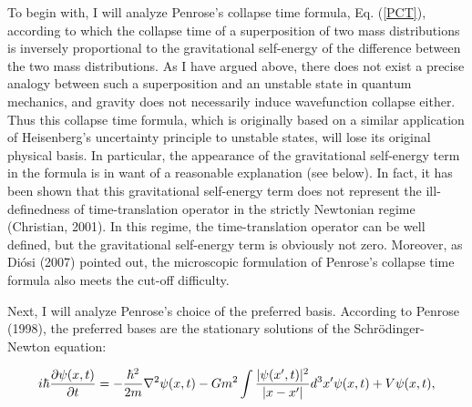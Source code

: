 To begin with, I will analyze Penrose's collapse time formula, Eq. (\ref{PCT}), according to which the collapse time of a superposition of two mass distributions is inversely proportional to the gravitational self-energy of the difference between the two mass distributions. As I have argued above, there does not exist a precise analogy between such a superposition and an unstable state in quantum mechanics, and gravity does not necessarily induce wavefunction collapse either. Thus this collapse time formula, which is originally based on a similar application of Heisenberg's uncertainty principle to unstable states, will lose its original physical basis. In particular, the appearance of the gravitational self-energy term in the formula is in want of a reasonable explanation (see below). In fact, it has been shown that this gravitational self-energy term does not represent the ill-definedness of time-translation operator in the strictly Newtonian regime (Christian, 2001). In this regime, the time-translation operator can be well defined, but the gravitational self-energy term is obviously not zero. Moreover, as Di\'{o}si (2007) pointed out, the microscopic formulation of Penrose's collapse time formula also meets the cut-off difficulty.

Next, I will analyze Penrose's choice of the preferred basis. According to Penrose (1998), the preferred bases are the stationary solutions of the Schr\"{o}dinger-Newton equation:

\begin{equation}
i\hbar {\partial \psi(x,t) \over \partial t}=-{\hbar^2 \over 2m}\nabla^2 \psi(x,t)-Gm^2\int{{|\psi(x',t)|^2 \over |x-x'|}d^3 x'}\psi(x,t)+V\psi(x,t),
\label{SN}
\end{equation}

